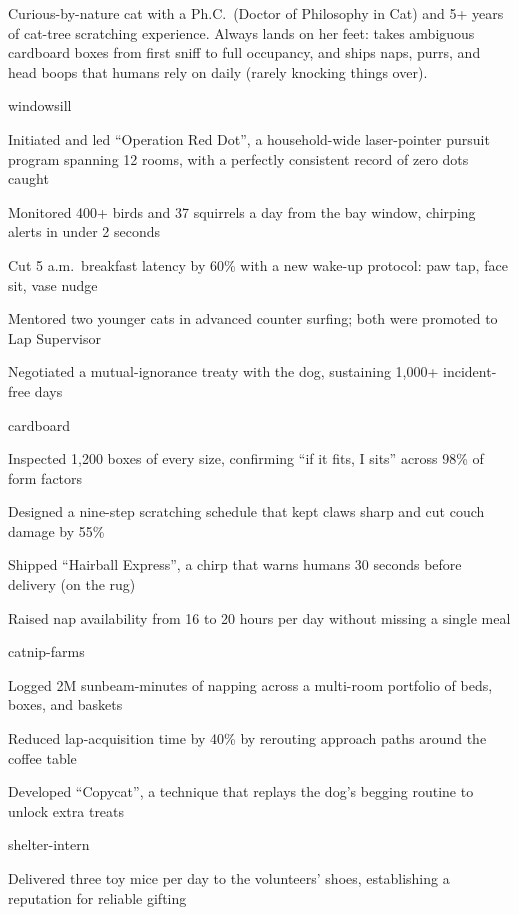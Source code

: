 \documentclass{resume}
\begin{document}
\begin{summary}
  Curious-by-nature cat with a Ph.C.\ (Doctor of Philosophy in Cat) and 5+ years of cat-tree scratching experience. Always lands on her feet: takes ambiguous cardboard boxes from first sniff to full occupancy, and ships naps, purrs, and head boops that humans rely on daily (rarely knocking things over).
\end{summary}

\begin{experience}
  \begin{role}{windowsill}
    \item Initiated and led ``Operation Red Dot'', a household-wide laser-pointer pursuit program spanning 12 rooms, with a perfectly consistent record of zero dots caught
    \item Monitored 400+ birds and 37 squirrels a day from the bay window, chirping alerts in under 2 seconds
    \item Cut 5 a.m.\ breakfast latency by 60\% with a new wake-up protocol: paw tap, face sit, vase nudge
    \item Mentored two younger cats in advanced counter surfing; both were promoted to Lap Supervisor
    \item Negotiated a mutual-ignorance treaty with the dog, sustaining 1,000+ incident-free days
  \end{role}
  \begin{role}{cardboard}
    \item Inspected 1,200 boxes of every size, confirming ``if it fits, I sits'' across 98\% of form factors
    \item Designed a nine-step scratching schedule that kept claws sharp and cut couch damage by 55\%
    \item Shipped ``Hairball Express'', a chirp that warns humans 30 seconds before delivery (on the rug)
    \item Raised nap availability from 16 to 20 hours per day without missing a single meal
  \end{role}
  \begin{role}{catnip-farms}
    \item Logged 2M sunbeam-minutes of napping across a multi-room portfolio of beds, boxes, and baskets
    \item Reduced lap-acquisition time by 40\% by rerouting approach paths around the coffee table
    \item Developed ``Copycat'', a technique that replays the dog's begging routine to unlock extra treats
  \end{role}
  \begin{role}{shelter-intern}
    \item Delivered three toy mice per day to the volunteers' shoes, establishing a reputation for reliable gifting
  \end{role}
\end{experience}
\end{document}
